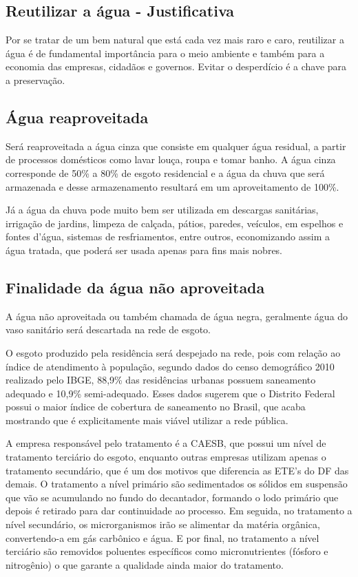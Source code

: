 \subsection{Reutilizar a água - Justificativa}

	Por se tratar de um bem natural que está cada vez mais raro e caro, reutilizar a água é de fundamental importância para o meio ambiente e também para a economia das empresas, cidadãos e governos. Evitar o desperdício é a chave para a preservação.

\subsection{Água reaproveitada}

	Será reaproveitada a água cinza que consiste em qualquer água residual, a partir de processos domésticos como lavar louça, roupa e tomar banho. A água cinza corresponde de 50\% a 80\% de esgoto residencial e a água da chuva que será armazenada e desse armazenamento resultará em um aproveitamento de 100\%.

	Já a água da chuva pode muito bem ser utilizada em descargas sanitárias, irrigação de jardins, limpeza de calçada, pátios, paredes, veículos, em espelhos e fontes d’água, sistemas de resfriamentos, entre outros, economizando assim a água tratada, que poderá ser usada apenas para fins mais nobres.

\subsection{Finalidade da água não aproveitada}

	A água não aproveitada ou também chamada de água negra, geralmente água do vaso sanitário será descartada na rede de esgoto.

	O esgoto produzido pela residência será despejado na rede, pois com relação ao índice de atendimento à população, segundo dados do censo demográfico 2010 realizado pelo IBGE, 88,9\% das residências urbanas possuem saneamento adequado e 10,9\% semi-adequado. Esses dados sugerem que o Distrito Federal possui o maior índice de cobertura de saneamento no Brasil, que acaba mostrando que é explicitamente mais viável utilizar a rede pública.

	A empresa responsável pelo tratamento é a CAESB, que possui um nível de tratamento terciário do esgoto, enquanto outras empresas utilizam apenas o tratamento secundário, que é um dos motivos que diferencia as ETE's do DF das demais. O tratamento a nível primário são sedimentados os sólidos em suspensão que vão se acumulando no fundo do decantador, formando o lodo primário que depois é retirado para dar continuidade ao processo. Em seguida, no tratamento a nível secundário, os microrganismos irão se alimentar da matéria orgânica, convertendo-a em gás carbônico e água. E por final, no tratamento a nível terciário são removidos poluentes específicos como micronutrientes (fósforo e nitrogênio) o que garante a qualidade ainda maior do tratamento.

